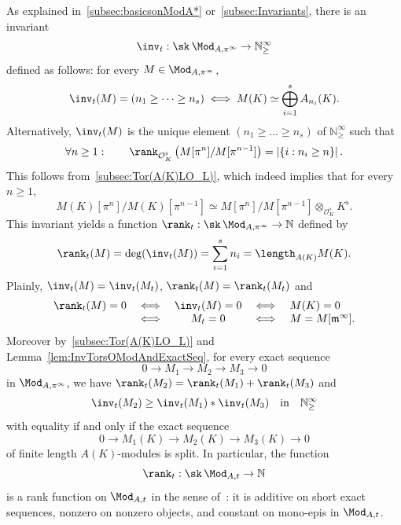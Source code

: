\subsubsection{}

As explained in~\ref{subsec:basicsonModA*} or~\ref{subsec:Invariants}, there is an invariant
\[
\inv_{t}:\sk\,\Mod_{A,\pi^{\infty}}\rightarrow\mathbb{N}_{\geq}^{\infty}
\]
defined as follows: for every $M\in\Mod_{A,\pi^{\infty}}$,
\[
\inv_{t}(M)=(n_{1}\geq\dots\geq n_{s})\iff M(K)\simeq\bigoplus_{i=1}^{s}A_{n_{i}}(K).
\]
Alternatively, $\inv_{t}(M)$ is the unique element $(n_{1}\geq\dots\geq n_{s})$ of $\mathbb{N}_{\geq}^{\infty}$ such that
\[
\forall n\geq1:\qquad\rank_{\mathcal{O}_{K}^{\flat}}\left(M[\pi^{n}]/M[\pi^{n-1}]\right)=\left|\left\{ i:n_{i}\geq n\right\} \right|.
\]
This follows from~\ref{subsec:Tor(A(K)LO_L)}, which indeed implies that for every $n\geq1$,
\[
M(K)[\pi^{n}]/M(K)[\pi^{n-1}]\simeq M[\pi^{n}]/M[\pi^{n-1}]\otimes_{\mathcal{O}_{K}^{\flat}}K^{\flat}.
\]
This invariant yields a function $\rank_{t}:\sk\,\Mod_{A,\pi^{\infty}}\rightarrow\mathbb{N}$ defined by
\[
\rank_{t}(M)=\deg(\inv_{t}(M))=\sum_{i=1}^{s}n_{i}=\length_{A(K)}M(K).
\]
Plainly, $\inv_{t}(M)=\inv_{t}(M_{t})$, $\rank_{t}(M)=\rank_{t}(M_{t})$ and
\[
\begin{array}{rcccl}
\rank_{t}(M)=0 & \iff & \inv_{t}(M)=0 & \iff & {M}(K)=0\\
& \iff & M_{t}=0 & \iff & M=M[\mathfrak{m}^{\infty}].
\end{array}
\]
Moreover by~\ref{subsec:Tor(A(K)LO_L)} and Lemma~\ref{lem:InvTorsOModAndExactSeq}, for every exact sequence
\[
0\rightarrow M_{1}\rightarrow M_{2}\rightarrow M_{3}\rightarrow0
\]
in $\Mod_{A,\pi^{\infty}}$, we have $\rank_{t}(M_{2})=\rank_{t}(M_{1})+\rank_{t}(M_{3})$ and
\[
\inv_{t}(M_{2})\geq\inv_{t}(M_{1})\ast\inv_{t}(M_{3})\quad\text{in}\quad\mathbb{N}_{\geq}^{\infty}
\]
with equality if and only if the exact sequence
\[
0\rightarrow M_{1}(K)\rightarrow M_{2}(K)\rightarrow M_{3}(K)\rightarrow0
\]
of finite length $A(K)$-modules is split. In particular, the function
\[
\rank_{t}:\sk\,\Mod_{A,t}\rightarrow\mathbb{N}
\]
is a rank function on $\Mod_{A,t}$ in the sense of~\cite{Co16}: it is additive on short exact sequences, nonzero on nonzero objects, and constant on mono-epis in $\Mod_{A,t}$.

\subsubsection{}\label{subsec:rankfree/tors}

